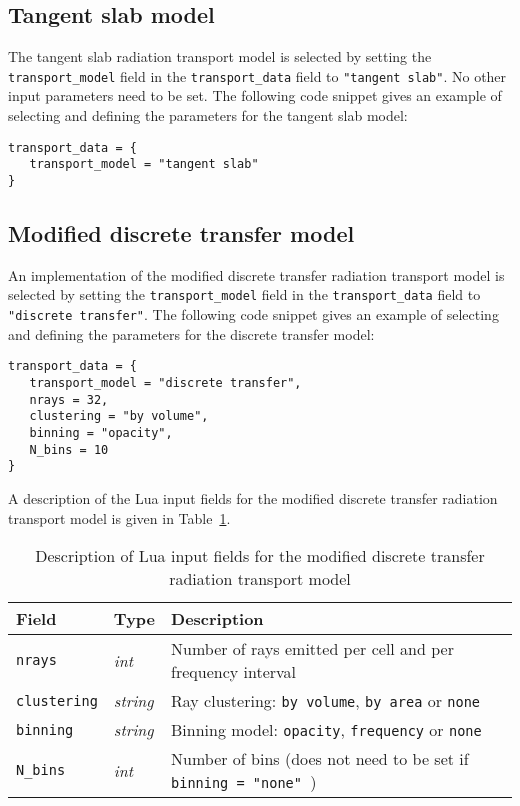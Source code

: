 \subsection{Tangent slab model}

The tangent slab radiation transport model is selected by setting the \texttt{transport\_model} field in the \texttt{transport\_data} field to \texttt{"tangent slab"}.
No other input parameters need to be set.
The following code snippet gives an example of selecting and defining the parameters for the tangent slab model:

\noindent \topbar
\begin{lstlisting}[basicstyle=\ttfamily\normalsize]
transport_data = {
   transport_model = "tangent slab"
}
\end{lstlisting}
\bottombar

\subsection{Modified discrete transfer model}

An implementation of the modified discrete transfer radiation transport model is selected by setting the \texttt{transport\_model} field in the \texttt{transport\_data} field to \texttt{"discrete transfer"}.
The following code snippet gives an example of selecting and defining the parameters for the discrete transfer model:

\noindent \topbar
\begin{lstlisting}[basicstyle=\ttfamily\normalsize]
transport_data = {
   transport_model = "discrete transfer",
   nrays = 32,
   clustering = "by volume",
   binning = "opacity",
   N_bins = 10
}
\end{lstlisting}
\bottombar

A description of the Lua input fields for the modified discrete transfer radiation transport model is given in Table~\ref {tab:DTM-input}.

\begin{table}[h]
 \begin{center}
  \caption{Description of Lua input fields for the modified discrete transfer radiation transport model}
  \label{tab:DTM-input}
\begin{tabular}{llp{8cm}}
 \hline \hline
 Field                        & Type              &  Description \\ \hline
\texttt{nrays}            & \textit{int}       &  Number of rays emitted per cell and per frequency interval \\
\texttt{clustering}    & \textit{string}  &  Ray clustering: \texttt{by volume}, \texttt{by area} or \texttt{none} \\
\texttt{binning}        & \textit{string}  &  Binning model: \texttt{opacity}, \texttt{frequency} or \texttt{none} \\
\texttt{N\_bins}         & \textit{int}       &  Number of bins (does not need to be set if \texttt{ binning = "none" }) \\
\hline
\end{tabular}
\end{center}
\end{table}

